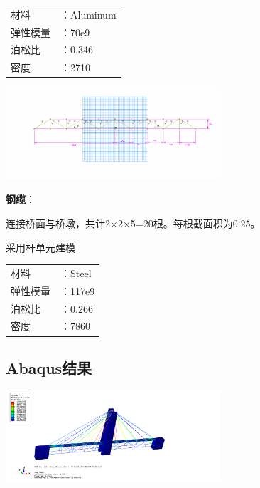 \documentclass[UTF8]{ctexbook}
\begin{document}
\begin{center}
\begin{tabular}{ll}
材料&：Aluminum\\
弹性模量&：70e9\\
泊松比&：0.346\\
密度&：2710\\
\end{tabular}
\end{center}
\begin{center}
\includegraphics[width=0.6\textwidth]{04.png}
\end{center}

\textbf{钢缆}：

连接桥面与桥墩，共计2×2×5=20根。每根截面积为0.25。

采用杆单元建模

\begin{center}
\begin{tabular}{ll}
材料&：Steel\\
弹性模量&：117e9\\
泊松比&：0.266\\
密度&：7860\\
\end{tabular}
\end{center}

\subsection{Abaqus结果}
\begin{center}
\includegraphics[width=0.6\textwidth]{05.png}
\end{center}


\end{document}
